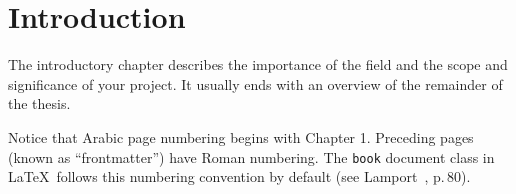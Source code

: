 \documentclass[main]{subfiles}
\begin{document}
\chapter{Introduction}

The introductory chapter describes the importance of the field and the
scope and significance of your project.  It usually ends with an
overview of the remainder of the thesis.

Notice that Arabic page numbering begins with Chapter 1.  Preceding
pages (known as ``frontmatter'') have Roman numbering.  The
\texttt{book} document class in \LaTeX\ follows this numbering
convention by default (see Lamport~\cite{lamport}, p.\,80).
\end{document}
